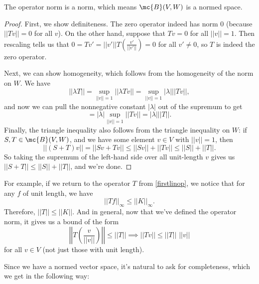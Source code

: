 \begin{theorem}
The operator norm is a norm, which means $\mc{B}(V, W)$ is a normed space. 
\end{theorem}
\begin{proof}
First, we show definiteness. The zero operator indeed has norm $0$ (because $||Tv|| = 0$ for all $v$). On the other hand, suppose that $Tv = 0$ for all $||v|| = 1$. Then rescaling tells us that $0 = Tv' = ||v'|| T\left(\frac{v'}{||v'||}\right) = 0$ for all $v' \ne 0$, so $T$ is indeed the zero operator.

Next, we can show homogeneity, which follows from the homogeneity of the norm on $W$. We have 
\[
    \boxed{||\lambda T||} = \sup_{||v|| = 1} ||\lambda Tv|| = \sup_{||v|| = 1} |\lambda| ||Tv||,
\]
and now we can pull the nonnegative constant $|\lambda|$ out of the supremum to get 
\[
    = |\lambda| \sup_{||v|| = 1} ||Tv|| = \boxed{|\lambda| ||T||}.
\]
Finally, the triangle inequality also follows from the triangle inequality on $W$: if $S, T \in \mc{B}(V, W)$, and we have some element $v \in V$ with $||v|| = 1$, then 
\[
    ||(S+T)v|| = ||Sv + Tv|| \le ||Sv|| + ||Tv|| \le ||S|| + ||T||.
\]
So taking the supremum of the left-hand side over all unit-length $v$ gives us $||S+T|| \le ||S|| + ||T||$, and we're done.
\end{proof}

For example, if we return to the operator $T$ from \cref{firstlinop}, we notice that for any $f$ of unit length, we have
\[
    ||Tf||_{\infty} \le ||K||_{\infty}.
\]
Therefore, $||T|| \le ||K||$. And in general, now that we've defined the operator norm, it gives us a bound of the form 
\[
    \left|\left|T\left(\frac{v}{||v||}\right)\right|\right| \le ||T|| \implies ||Tv|| \le ||T|| \, \, ||v||
\]
for all $v \in V$ (not just those with unit length).

Since we have a normed vector space, it's natural to ask for completeness, which we get in the following way:

